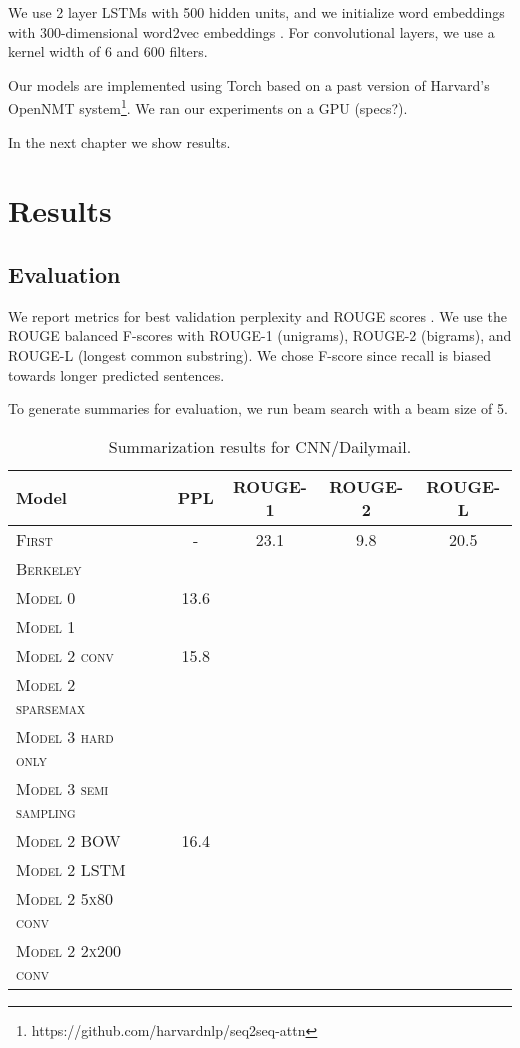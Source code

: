 \documentclass[11pt]{report}
\begin{document}
We use 2 layer LSTMs with 500 hidden units, and we initialize word embeddings with 300-dimensional word2vec embeddings \citep{mikolov2013word2vec}. For convolutional layers, we use a kernel width of 6 and 600 filters.





Our models are implemented using Torch \citep{Torch} based on a past version of Harvard's OpenNMT system\footnote{https://github.com/harvardnlp/seq2seq-attn}. We ran our experiments on a GPU (specs?).

In the next chapter we show results.

\chapter{Results}

\section{Evaluation}

We report metrics for best validation perplexity and ROUGE scores \citep{lin2004rouge}. We use the ROUGE balanced F-scores with ROUGE-1 (unigrams), ROUGE-2 (bigrams), and ROUGE-L (longest common substring). We chose F-score since recall is biased towards longer predicted sentences.

To generate summaries for evaluation, we run beam search with a beam size of 5.



\begin{table}[h]
\centering
\begin{tabular}{llcccc}
 \toprule
 Model &  & PPL & ROUGE-1 & ROUGE-2 & ROUGE-L \\
 \midrule
\textsc{First} & & - & 23.1 & 9.8 & 20.5 \\
\textsc{Berkeley} \\
\textsc{Model 0} & & 13.6 &  \\
 \textsc{Model 1} & & \\
\textsc{Model 2 conv} & & 15.8 & & \\
\textsc{Model 2 sparsemax} & & \\
\textsc{Model 3 hard only}  \\
\textsc{Model 3 semi sampling}  \\
\midrule
\textsc{Model 2 BOW} & & 16.4 & & \\
\textsc{Model 2 LSTM}  & & \\
\textsc{Model 2 5x80 conv} \\
\textsc{Model 2 2x200 conv} \\
 \bottomrule
\end{tabular}
\caption{Summarization results for CNN/Dailymail.}
\label{table:summary}
\end{table}
\end{document}

